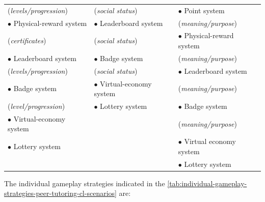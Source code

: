 {\begin{longtable}{l|l|l}
(\emph{levels/progression})&
(\emph{social status})&
$\bullet$ Point system\tabularnewline

$\bullet$ Physical-reward system&
$\bullet$ Leaderboard system&
(\emph{meaning/purpose})\tabularnewline

(\emph{certificates})&
(\emph{social status})&
$\bullet$ Physical-reward system\tabularnewline

$\bullet$ Leaderboard system&
$\bullet$ Badge system&
(\emph{meaning/purpose})\tabularnewline

(\emph{levels/progression})&
(\emph{social status})&
$\bullet$ Leaderboard system\tabularnewline

$\bullet$ Badge system&
$\bullet$ Virtual-economy system&
(\emph{meaning/purpose})\tabularnewline

(\emph{level/progression})&
$\bullet$ Lottery system&
$\bullet$ Badge system\tabularnewline

$\bullet$ Virtual-economy system&
&
(\emph{meaning/purpose})\tabularnewline

$\bullet$ Lottery system&
&
$\bullet$ Virtual economy system\tabularnewline

&
&
$\bullet$ Lottery system\tabularnewline

\hline
\end{longtable}
}

The individual gameplay strategies indicated in the \autoref{tab:individual-gameplay-strategies-peer-tutoring-cl-scenarios} are:

